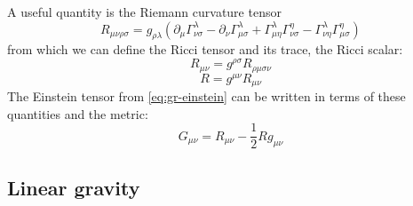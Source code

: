 A useful quantity is the Riemann curvature tensor
\begin{equation}\label{eq:gr-riemann}
	R_{\mu\nu\rho\sigma} = g_{\rho\lambda} \left(
		\partial_{\mu} \Gamma^{\lambda}_{\nu\sigma}
		- \partial_{\nu} \Gamma^{\lambda}_{\mu\sigma}
		+ \Gamma^{\lambda}_{\mu\eta} \Gamma^{\eta}_{\nu\sigma}
		- \Gamma^{\lambda}_{\nu\eta} \Gamma^{\eta}_{\mu\sigma}
	\right)
\end{equation}
from which we can define the Ricci tensor and its trace, the Ricci scalar:
\begin{equation}\label{eq:gr-ricci-tensor}
	R_{\mu\nu} = g^{\rho\sigma} R_{\rho\mu\sigma\nu}
\end{equation}
\begin{equation}\label{eq:gr-ricci-scalar}
	R = g^{\mu\nu} R_{\mu\nu}
\end{equation}
The Einstein tensor from \cref{eq:gr-einstein} can be written in terms of these quantities and the metric:
\begin{equation}\label{eq:gr-G}
	G_{\mu\nu} = R_{\mu\nu} - \frac{1}{2} R g_{\mu\nu}
\end{equation}

\subsection{Linear gravity}

